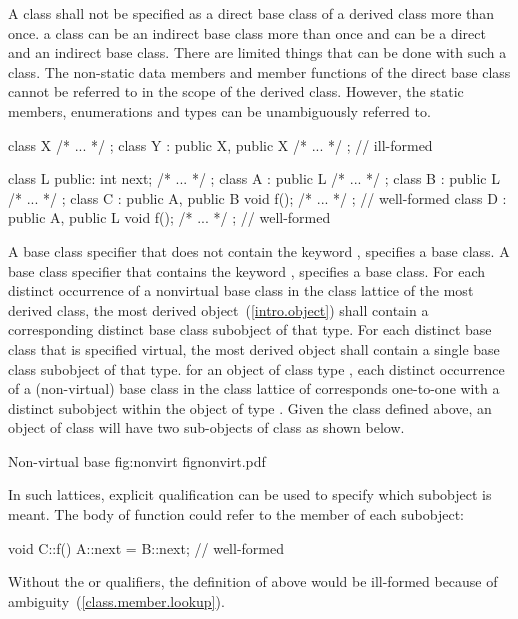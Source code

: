 \pnum
A class shall not be specified as a direct base class of a derived class
more than once.
\enternote
a class can be an indirect base class more than once and can be a direct
and an indirect base class. There are limited things that can be done
with such a class. The non-static data members and member functions of
the direct base class cannot be referred to in the scope of the derived
class. However, the static members, enumerations and types can be
unambiguously referred to.
\exitnote
\enterexample
\begin{codeblock}
class X { /* ... */ };
class Y : public X, public X { /* ... */ };	// ill-formed

\end{codeblock}
\begin{codeblock}
class L { public: int next;  /* ... */ };
class A : public L { /* ... */ };
class B : public L { /* ... */ };
class C : public A, public B { void f(); /* ... */ };   // well-formed
class D : public A, public L { void f(); /* ... */ };   // well-formed
\end{codeblock}
\exitexampleb

\pnum
{}%
A base class specifier that does not contain the keyword
, specifies a  base class. A base
class specifier that contains the keyword , specifies a
 base class. For each distinct occurrence of a
nonvirtual base class in the class lattice of the most derived class,
the most derived object~(\ref{intro.object}) shall contain a
corresponding distinct base class subobject of that type. For each
distinct base class that is specified virtual, the most derived object
shall contain a single base class subobject of that type.
\enterexample
for an object of class type , each distinct occurrence of a
(non-virtual) base class  in the class lattice of 
corresponds one-to-one with a distinct  subobject within the
object of type . Given the class  defined above, an
object of class  will have two sub-objects of class  as
shown below.

\begin{importgraphic}
{Non-virtual base}
{fig:nonvirt}
{fignonvirt.pdf}
\end{importgraphic}

In such lattices, explicit qualification can be used to specify which
subobject is meant. The body of function  could refer to the
member  of each  subobject:
\begin{codeblock}
void C::f() { A::next = B::next; }      // well-formed
\end{codeblock}
Without the  or  qualifiers, the definition of
 above would be ill-formed because of
ambiguity~(\ref{class.member.lookup}).

